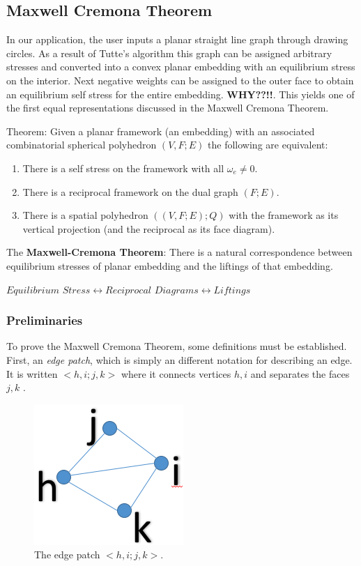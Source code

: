 \documentclass[11pt]{article}
\begin{document}
\subsection{Maxwell Cremona Theorem}
In our application, the user inputs a planar straight line graph through drawing circles. As a result of Tutte's algorithm this graph can be assigned arbitrary stresses and converted into a convex planar embedding with an equilibrium stress on the interior. Next negative weights can be assigned to the outer face to obtain an equilibrium self stress for the entire embedding. \textbf{WHY??!!}. This yields one of the first equal representations discussed in the Maxwell Cremona Theorem.

Theorem: Given a planar framework (an embedding) with an associated combinatorial spherical polyhedron $(V,F;E)$ the following are equivalent:
\begin{enumerate}
	\item There is a self stress on the framework with all $\omega_e \neq 0$.
	\item There is a reciprocal framework on the dual graph $(F;E)$.
	\item There is a spatial polyhedron $((V,F;E);Q)$ with the framework as its vertical projection (and the reciprocal as its face diagram).
 \end{enumerate}
 
 The \textbf{Maxwell-Cremona Theorem}: There is a natural correspondence between equilibrium stresses of planar embedding and the liftings of that embedding.
 
 $Equilibrium$  $Stress \leftrightarrow Reciprocal$ $Diagrams \leftrightarrow Liftings$
 
\subsubsection{Preliminaries}
To prove the Maxwell Cremona Theorem, some definitions must be established. First, an \emph{edge patch}, which is simply an different notation for describing an edge. It is written $<h,i;j,k>$ where it connects vertices $h,i$ and separates the faces $j,k$ \cite{mccProof}.
\begin{figure}[h]
      \centering
      \includegraphics[scale=.3]{edge_patch2}       
      \caption{The edge patch $<h,i;j,k>$.}
      \label{fig: Figure 4}
  \end{figure}
  
\end{document}
